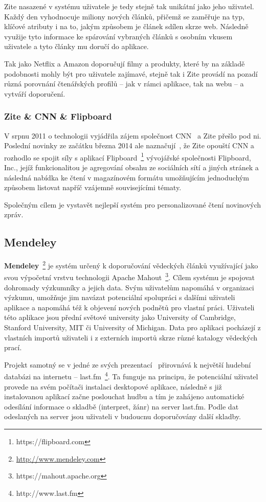 \documentclass[thesis=M,czech]{FITthesis}[2014/05/07]
\begin{document}
Zite nasazené v systému uživatele je tedy stejně tak unikátní jako jeho uživatel. Každý den vyhodnocuje miliony nových článků, přičemž se zaměřuje na typ, klíčové atributy i na to, jakým způsobem je článek sdílen skrze web. Následně využije tyto informace ke spárování vybraných článků s osobním vkusem uživatele a tyto články mu doručí do aplikace. 

Tak jako Netflix a Amazon doporučují filmy a produkty, které by na základě podobnosti mohly být pro uživatele zajímavé, stejně tak i Zite provádí na pozadí různá porovnání čtenářských profilů – jak v rámci aplikace, tak na webu – a vytváří doporučení.

\subsubsection{Zite \& CNN \& Flipboard}
V srpnu 2011 o technologii vyjádřila zájem společnost CNN~\cite{zitecnn} a Zite přešlo pod ni. Poslední novinky ze začátku března 2014 ale naznačují~\cite{ziteflip}, že Zite opouští CNN a rozhodlo se spojit síly s aplikací Flipboard~\footnote{https://flipboard.com} vývojářské společnosti Flipboard, Inc., jejíž funkcionalitou je agregování obsahu ze sociálních sítí a jiných stránek a následná nabídka ke čtení v magazínovém formátu umožňujícím jednoduchým způsobem listovat napříč vzájemně souvisejícími tématy.

Společným cílem je vystavět nejlepší systém pro personalizované čtení novinových zpráv. 

\subsection{Mendeley}	
\label{mendeley}
\textbf{Mendeley}~\footnote{\url{http://www.mendeley.com}} je systém určený k doporučování vědeckých článků využívající jako svou výpočetní vrstvu technologii Apache Mahout~\footnote{https://mahout.apache.org}. Cílem systému je spojovat dohromady výzkumníky a jejich data. Svým uživatelům napomáhá v organizaci výzkumu, umožňuje jim navázat potenciální spolupráci s dalšími uživateli aplikace a napomáhá též k objevení nových podnětů pro vlastní práci. Uživateli této aplikace jsou přední světové university jako University of Cambridge, Stanford University, MIT či University of Michigan. Data pro aplikaci pocházejí z vlastních importů uživateli i z externích importů skrze různé katalogy vědeckých prací. 

Projekt samotný se v jedné ze svých prezentací~\cite{mendeleylastfm} přirovnává k největší hudební databázi na internetu – last.fm~\footnote{http://www.last.fm}. Ta funguje na principu, že potenciální uživatel provede na svém počítači instalaci desktopové aplikace, následně s již instalovanou aplikací začne poslouchat hudbu a tím je zahájeno automatické odesílání informace o skladbě (interpret, žánr) na server last.fm. Podle dat odeslaných na server jsou uživateli v budoucnu doporučovány další skladby. 
\end{document}
